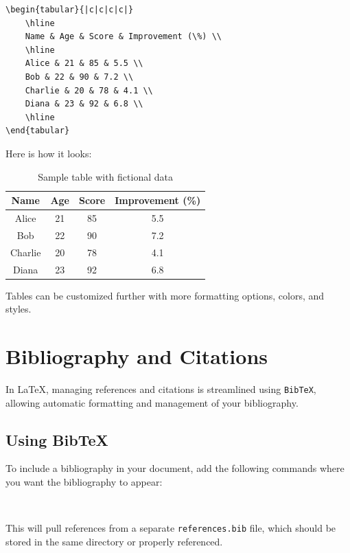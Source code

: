 \documentclass{article}
\begin{document}
\begin{verbatim}
\begin{tabular}{|c|c|c|c|}
    \hline
    Name & Age & Score & Improvement (\%) \\
    \hline
    Alice & 21 & 85 & 5.5 \\
    Bob & 22 & 90 & 7.2 \\
    Charlie & 20 & 78 & 4.1 \\
    Diana & 23 & 92 & 6.8 \\
    \hline
\end{tabular}
\end{verbatim}

Here is how it looks:

\begin{table}[h]
    \centering
    \begin{tabular}{|c|c|c|c|}
        \hline
        \textbf{Name} & \textbf{Age} & \textbf{Score} & \textbf{Improvement (\%)} \\
        \hline
        Alice & 21 & 85 & 5.5 \\
        Bob & 22 & 90 & 7.2 \\
        Charlie & 20 & 78 & 4.1 \\
        Diana & 23 & 92 & 6.8 \\
        \hline
    \end{tabular}
    \caption{Sample table with fictional data}
\end{table}

Tables can be customized further with more formatting options, colors, and styles.

\newpage

\section*{Bibliography and Citations}

In LaTeX, managing references and citations is streamlined using \texttt{BibTeX}, allowing automatic formatting and management of your bibliography.

\subsection*{Using BibTeX}
To include a bibliography in your document, add the following commands where you want the bibliography to appear:
\begin{verbatim}


\end{verbatim}
This will pull references from a separate \texttt{references.bib} file, which should be stored in the same directory or properly referenced.
\end{document}
